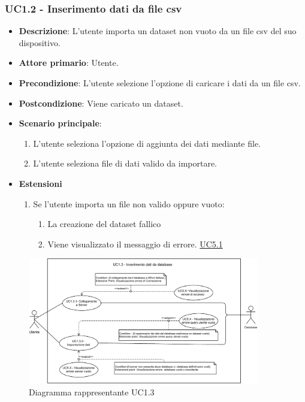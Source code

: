 \subsubsection{UC1.2 - Inserimento dati da file csv}
\label{ssub:uc1.2}
\begin{itemize}
    \item \textbf{Descrizione}: L'utente importa un dataset non vuoto da un file csv del suo dispositivo.

    \item \textbf{Attore primario}: Utente.
    
    \item \textbf{Precondizione}:   L'utente selezione l'opzione di caricare i dati da un file csv.
    \item \textbf{Postcondizione}:  Viene caricato un dataset. 

	\item \textbf{Scenario principale}:
		\begin{enumerate}
			\item L'utente seleziona l'opzione di aggiunta dei dati mediante file.
			\item L'utente seleziona file di dati valido da importare.
        \end{enumerate}
     
    \item \textbf{Estensioni}
    \begin{enumerate}
    
        \item Se l'utente importa un file non valido oppure vuoto:
        \begin{enumerate}
            \item La creazione del dataset fallico
            \item Viene visualizzato il messaggio di errore. \hyperref[ssub:uc5.1]{UC5.1}
        \end{enumerate}
    \end{enumerate}
\end{itemize}

\newpage
\begin{figure}[h]
    \centering
    \includegraphics[width=0.9\textwidth]{componenti/casi-duso/diagrammi/UC1_3.pdf}
    \caption{Diagramma rappresentante UC1.3}
    \label{fig:UC1.3}
\end{figure}


